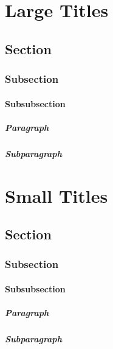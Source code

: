 \documentclass[english,12pt,openany,letterpaper]{book}
\begin{document}
\begin{multicols}{2}
	\largetitles{}
	\chapter*{Large Titles}
	\section*{Section}
	\subsection*{Subsection}
	\subsubsection*{Subsubsection}
	\paragraph*{Paragraph}
	\paragraph*{Subparagraph}
	
	\columnbreak
	
	\smalltitles{}
	\chapter*{Small Titles}
	\section*{Section}
	\subsection*{Subsection}
	\subsubsection*{Subsubsection}
	\paragraph*{Paragraph}
	\paragraph*{Subparagraph}
\end{multicols}
\end{document}
